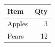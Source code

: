 \begin{tabular}{|l|r|}
\hline
Item & Qty \\
\hline
Apples & 3 \\
Pears & 12 \\
\hline
\end{tabular}
